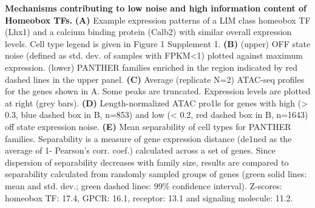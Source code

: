 \textbf{Mechanisms contributing to low noise and high information content of Homeobox TFs.} \textbf{(A)} Example expression patterns of a LIM class homeobox TF (Lhx1) and a calcium binding protein (Calb2) with similar overall expression levels. Cell type legend is given in Figure 1 Supplement 1. \textbf{(B)} (upper) OFF state noise (defined as std. dev. of samples with FPKM<1) plotted against maximum expression. (lower) PANTHER families enriched in the region indicated by red dashed lines in the upper panel. \textbf{(C)} Average (replicate N=2) ATAC-seq profiles for the genes shown in A. Some peaks are truncated. Expression levels are plotted at right (grey bars). \textbf{(D)} Length-normalized ATAC pro1le for genes with high (> 0.3, blue dashed box in B, n=853) and low (< 0.2, red dashed box in B, n=1643) off state expression noise. \textbf{(E)} Mean separability of cell types for PANTHER families. Separability is a measure of gene expression distance (de1ned as the average of 1- Pearson’s corr. coef.) calculated across a set of genes. Since dispersion of separability decreases with family size, results are compared to separability calculated from randomly sampled groups of genes (green solid lines: mean and std. dev.; green dashed lines: 99\% confidence interval). Z-scores: homeobox TF: 17.4, GPCR: 16.1, receptor: 13.1 and signaling molecule: 11.2.